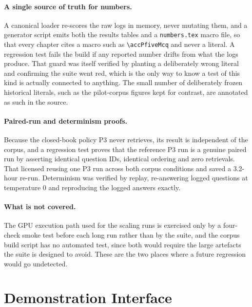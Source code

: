 \paragraph{A single source of truth for numbers.} A canonical loader re-scores
the raw logs in memory, never mutating them, and a generator script emits both
the results tables and a \texttt{numbers.tex} macro file, so that every chapter
cites a macro such as \verb|\accPfiveMcq| and never a literal. A regression
test fails the build if any reported number drifts from what the logs produce.
That guard was itself verified by planting a deliberately wrong literal and
confirming the suite went red, which is the only way to know a test of this
kind is actually connected to anything. The small number of deliberately
frozen historical literals, such as the pilot-corpus figures kept for
contrast, are annotated as such in the source.

\paragraph{Paired-run and determinism proofs.} Because the closed-book policy
P3 never retrieves, its result is independent of the corpus, and a regression
test proves that the reference P3 run is a genuine paired run by asserting
identical question IDs, identical ordering and zero retrievals. That licensed
reusing one P3 run across both corpus conditions and saved a 3.2-hour re-run.
Determinism was verified by replay, re-answering logged questions at
temperature 0 and reproducing the logged answers exactly.

\paragraph{What is not covered.} The GPU execution path used for the scaling
runs is exercised only by a four-check smoke test before each long run rather
than by the suite, and the corpus build script has no automated test, since
both would require the large artefacts the suite is designed to avoid. These
are the two places where a future regression would go undetected.


\section{Demonstration Interface}
\label{sec:impl-demo}

